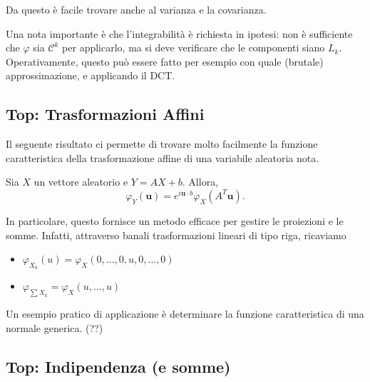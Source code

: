 Da questo è facile trovare anche al varianza e la covarianza.

Una nota importante è che l'integrabilità è richiesta in ipotesi: non è sufficiente che $\varphi$ sia $\mathcal{C}^k$ per applicarlo, ma si deve verificare che le componenti siano $L_k$. Operativamente, questo può essere fatto per esempio con quale (brutale) approssimazione, e applicando il DCT.

\subsection{Top: Trasformazioni Affini}

Il seguente risultato ci permette di trovare molto facilmente la funzione caratteristica della trasformazione affine di una variabile aleatoria nota.

\begin{my_lemma}
	Sia $X$ un vettore aleatorio e $Y=AX + b$. Allora,
	\[
		\varphi_Y (\mathbf{u}) = e^{i \mathbf{u} \cdot b} \varphi_X (A^T \mathbf{u}).
	\]
\end{my_lemma}

In particolare, questo fornisce un metodo efficace per gestire le proiezioni e le somme. Infatti, attraverso banali trasformazioni lineari di tipo riga, ricaviamo
\begin{itemize}
	\item $\varphi_{X_k} (u) = \varphi_X (0,\dots,0,u,0,\dots,0)$
	\item $\varphi_{\sum X_k} =  \varphi_X (u,\dots,u)$
\end{itemize}

Un esempio pratico di applicazione è determinare la funzione caratteristica di una normale generica. (??)

\subsection{Top: Indipendenza (e somme)}

